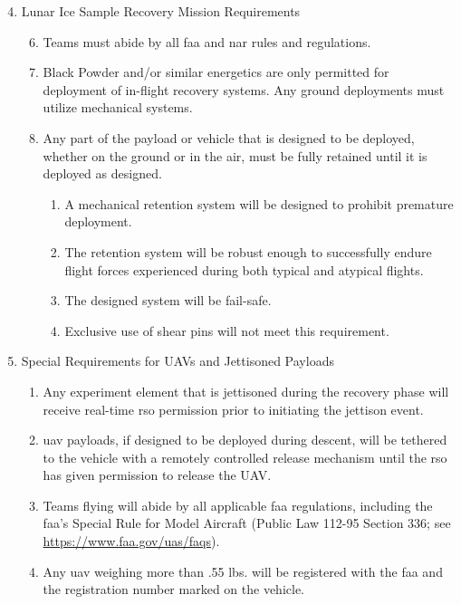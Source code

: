 \begin{enumerate}[noitemsep, label=4.\arabic*.]
	\setcounter{enumi}{3}
	\item Lunar Ice Sample Recovery Mission Requirements
	\begin{enumerate}[noitemsep, label=4.3.\arabic*.]
		\setcounter{enumi}{5}
		\item Teams must abide by all \gls{faa} and \gls{nar} rules and regulations.
		\item Black Powder and/or similar energetics are only permitted for deployment of in-flight recovery systems. Any ground deployments must utilize mechanical systems.
		\item Any part of the payload or vehicle that is designed to be deployed, whether on the ground or in the air, must be fully retained until it is deployed as designed.
		\begin{enumerate}[noitemsep, label=4.3.7.\arabic*.]
			\item A mechanical retention system will be designed to prohibit premature deployment.
			\item The retention system will be robust enough to successfully endure flight forces experienced during both typical and atypical flights.
			\item The designed system will be fail-safe.
			\item Exclusive use of shear pins will not meet this requirement.
		\end{enumerate}
	\end{enumerate}
	\item Special Requirements for UAVs and Jettisoned Payloads
	\begin{enumerate}[noitemsep, label=4.4.\arabic*.]
		\item Any experiment element that is jettisoned during the recovery phase will receive real-time \gls{rso} permission prior to initiating the jettison event.
		\item \gls{uav} payloads, if designed to be deployed during descent, will be tethered to the vehicle with a remotely controlled release mechanism until the \gls{rso} has given permission to release the UAV.
		\item Teams flying  will abide by all applicable \gls{faa} regulations, including the \gls{faa}'s Special Rule for Model Aircraft (Public Law 112-95 Section 336; see \url{https://www.faa.gov/uas/faqs}).
		\item Any \gls{uav} weighing more than .55 lbs. will be registered with the \gls{faa} and the registration number marked on the vehicle.
	\end{enumerate}
\end{enumerate}


